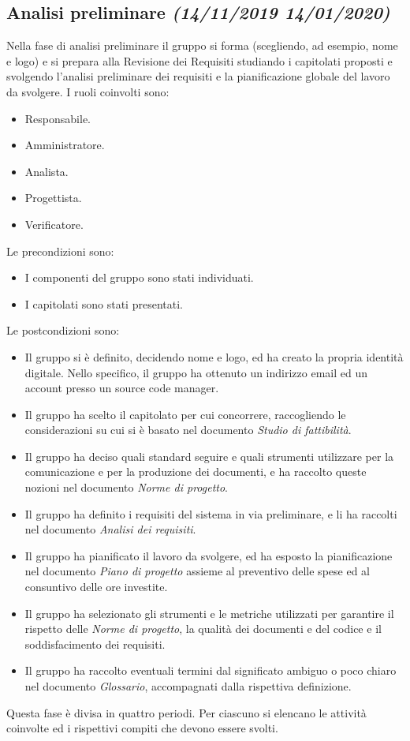 \documentclass[../piano-di-progetto.tex]{subfiles}
\begin{document}
\subsection[Analisi preliminare]{Analisi preliminare {\normalsize\normalfont\itshape(14/11/2019  14/01/2020)}}%
\label{sub:analisi_preliminare}
Nella fase di analisi preliminare il gruppo si forma (scegliendo, ad esempio, nome e logo) e si prepara alla Revisione dei Requisiti studiando i capitolati proposti e svolgendo l'analisi preliminare dei requisiti e la pianificazione globale del lavoro da svolgere.
I ruoli coinvolti sono:
\begin{itemize}
  \item Responsabile.
  \item Amministratore.
  \item Analista.
  \item Progettista.
  \item Verificatore.
\end{itemize}
Le precondizioni sono:
\begin{itemize}
  \item I componenti del gruppo sono stati individuati.
  \item I capitolati sono stati presentati.
\end{itemize}
Le postcondizioni sono:
\begin{itemize}
  \item Il gruppo si è definito, decidendo nome e logo, ed ha creato la propria identità digitale. Nello specifico, il gruppo ha ottenuto un indirizzo email ed un account presso un source code manager.
  \item Il gruppo ha scelto il capitolato per cui concorrere, raccogliendo le considerazioni su cui si è basato nel documento \textit{Studio di fattibilità}.
  \item Il gruppo ha deciso quali standard seguire e quali strumenti utilizzare per la comunicazione e per la produzione dei documenti, e ha raccolto queste nozioni nel documento \textit{Norme di progetto}.
  \item Il gruppo ha definito i requisiti del sistema in via preliminare, e li ha raccolti nel documento \textit{Analisi dei requisiti}.
  \item Il gruppo ha pianificato il lavoro da svolgere, ed ha esposto la pianificazione nel documento \textit{Piano di progetto} assieme al preventivo delle spese ed al consuntivo delle ore investite.
  \item Il gruppo ha selezionato gli strumenti e le metriche utilizzati per garantire il rispetto delle \textit{Norme di progetto}, la qualità dei documenti e del codice e il soddisfacimento dei requisiti.
  \item Il gruppo ha raccolto eventuali termini dal significato ambiguo o poco chiaro nel documento \textit{Glossario}, accompagnati dalla rispettiva definizione.
\end{itemize}
Questa fase è divisa in quattro periodi.
Per ciascuno si elencano le attività coinvolte ed i rispettivi compiti che devono essere svolti.
\end{document}
